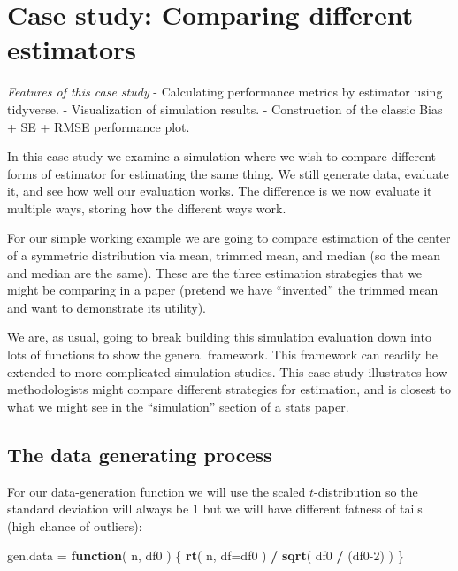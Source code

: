 \documentclass[
]{book}
\newenvironment{Shaded}{\begin{snugshade}}{\end{snugshade}}
\newcommand{\AttributeTok}[1]{\textcolor[rgb]{0.13,0.29,0.53}{#1}}
\newcommand{\ControlFlowTok}[1]{\textcolor[rgb]{0.13,0.29,0.53}{\textbf{#1}}}
\newcommand{\DecValTok}[1]{\textcolor[rgb]{0.00,0.00,0.81}{#1}}
\newcommand{\FunctionTok}[1]{\textcolor[rgb]{0.13,0.29,0.53}{\textbf{#1}}}
\newcommand{\NormalTok}[1]{#1}
\newcommand{\OtherTok}[1]{\textcolor[rgb]{0.56,0.35,0.01}{#1}}
\newcommand{\SpecialCharTok}[1]{\textcolor[rgb]{0.81,0.36,0.00}{\textbf{#1}}}
\begin{document}
\chapter{Case study: Comparing different estimators}\label{case-study-comparing-different-estimators}

\emph{Features of this case study}
- Calculating performance metrics by estimator using tidyverse.
- Visualization of simulation results.
- Construction of the classic Bias + SE + RMSE performance plot.

In this case study we examine a simulation where we wish to compare different forms of
estimator for estimating the same thing. We still generate data, evaluate it,
and see how well our evaluation works. The difference is we now evaluate it
multiple ways, storing how the different ways work.

For our simple working example we are going to compare estimation of the
center of a symmetric distribution via mean, trimmed mean, and median (so the
mean and median are the same). These are the three estimation strategies
that we might be comparing in a paper (pretend we have ``invented'' the trimmed
mean and want to demonstrate its utility).

We are, as usual, going to break building this simulation evaluation down into lots of
functions to show the general framework. This framework can readily be
extended to more complicated simulation studies.
This case study illustrates how methodologists might compare different strategies for estimation, and is
closest to what we might see in the ``simulation'' section of a stats paper.

\section{The data generating process}\label{the-data-generating-process-1}

For our data-generation function we will use the scaled \(t\)-distribution so
the standard deviation will always be 1 but we will have different fatness of
tails (high chance of outliers):

\begin{Shaded}
\begin{Highlighting}[]
\NormalTok{gen.data }\OtherTok{=} \ControlFlowTok{function}\NormalTok{( n, df0 ) \{}
    \FunctionTok{rt}\NormalTok{( n, }\AttributeTok{df=}\NormalTok{df0 ) }\SpecialCharTok{/} \FunctionTok{sqrt}\NormalTok{( df0 }\SpecialCharTok{/}\NormalTok{ (df0}\DecValTok{{-}2}\NormalTok{) )}
\NormalTok{\}}
\end{Highlighting}
\end{Shaded}
\end{document}
